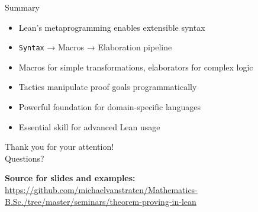 \documentclass{beamer}
\begin{document}
\begin{frame}{Summary}
    \begin{itemize}[<+->]
        \item Lean's metaprogramming enables extensible syntax
        \item \lstinline{Syntax} → Macros → Elaboration pipeline
        \item Macros for simple transformations, elaborators for complex logic
        \item Tactics manipulate proof goals programmatically
        \item Powerful foundation for domain-specific languages
        \item Essential skill for advanced Lean usage
    \end{itemize}

    \vspace{1cm}
    \begin{center}
        \Large Thank you for your attention!\\
        \vspace{0.5cm}
        Questions?

        \textbf{Source for slides and examples:}
        \url{https://github.com/michaelvanstraten/Mathematics-B.Sc./tree/master/seminars/theorem-proving-in-lean}
    \end{center}

\end{frame}
\endNoHyper
\end{document}
